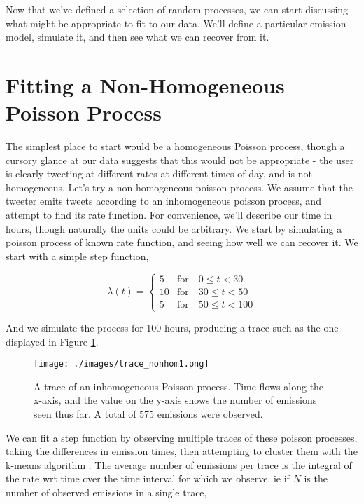 Now that we've defined a selection of random processes, we can start discussing what might be appropriate to fit to our data. We'll define a particular emission model, simulate it, and then see what we can recover from it.

\section{Fitting a Non-Homogeneous Poisson Process}

The simplest place to start would be a homogeneous Poisson process, though a cursory glance at our data suggests that this would not be appropriate - the user is clearly tweeting at different rates at different times of day, and is not homogeneous. Let's try a non-homogeneous poisson process. We assume that the tweeter emits tweets according to an inhomogeneous poisson process, and attempt to find its rate function. For convenience, we'll describe our time in hours, though naturally the units could be arbitrary. We start by simulating a poisson process of known rate function, and seeing how well we can recover it. We start with a simple step function,

$$
\lambda(t) = 
\begin{cases}
5  & \mbox{for} \quad 0  \leqslant t < 30\\
10 & \mbox{for} \quad 30 \leqslant t < 50\\
5  & \mbox{for} \quad 50 \leqslant t < 100
\end{cases}
$$

And we simulate the process for 100 hours, producing a trace such as the one displayed in Figure \ref{trace_nonhom1}.

\begin{figure}[h]
\texttt{[image: ./images/trace\_nonhom1.png]}
\caption{A trace of an inhomogeneous Poisson process. Time flows along the x-axis, and the value on the y-axis shows the number of emissions seen thus far. A total of 575 emissions were observed.}
\label{trace_nonhom1}
\end{figure}

We can fit a step function by observing multiple traces of these poisson processes, taking the differences in emission times, then attempting to cluster them with the k-means algorithm \cite{kmeans}. The average number of emissions per trace is the integral of the rate wrt time over the time interval for which we observe, ie if $N$ is the number of observed emissions in a single trace,

